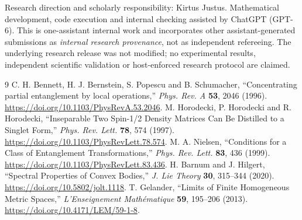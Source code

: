 \documentclass[10pt,letterpaper]{article}
\begin{document}
Research direction and scholarly responsibility: Kirtus Justus.
Mathematical development, code execution and internal checking assisted by
ChatGPT (GPT-6). This is one-assistant internal work and incorporates
other assistant-generated submissions as \emph{internal research provenance},
not as independent refereeing. The underlying research release was not
modified; no experimental results, independent scientific validation or
host-enforced research protocol are claimed.

\begin{thebibliography}{9}\small
{} C. H. Bennett, H. J. Bernstein, S. Popescu and
B. Schumacher, ``Concentrating partial entanglement by local operations,''
\emph{Phys. Rev. A} \textbf{53}, 2046 (1996).
\url{https://doi.org/10.1103/PhysRevA.53.2046}.
 M. Horodecki, P. Horodecki and R. Horodecki,
``Inseparable Two Spin-1/2 Density Matrices Can Be Distilled to a Singlet Form,''
\emph{Phys. Rev. Lett.} \textbf{78}, 574 (1997).
\url{https://doi.org/10.1103/PhysRevLett.78.574}.
 M. A. Nielsen,
``Conditions for a Class of Entanglement Transformations,''
\emph{Phys. Rev. Lett.} \textbf{83}, 436 (1999).
\url{https://doi.org/10.1103/PhysRevLett.83.436}.
 H. Barnum and J. Hilgert,
``Spectral Properties of Convex Bodies,''
\emph{J. Lie Theory} \textbf{30}, 315--344 (2020).
\url{https://doi.org/10.5802/jolt.1118}.
 T. Gelander,
``Limits of Finite Homogeneous Metric Spaces,''
\emph{L'Enseignement Math\'ematique} \textbf{59}, 195--206 (2013).
\url{https://doi.org/10.4171/LEM/59-1-8}.
\end{thebibliography}
\end{document}
